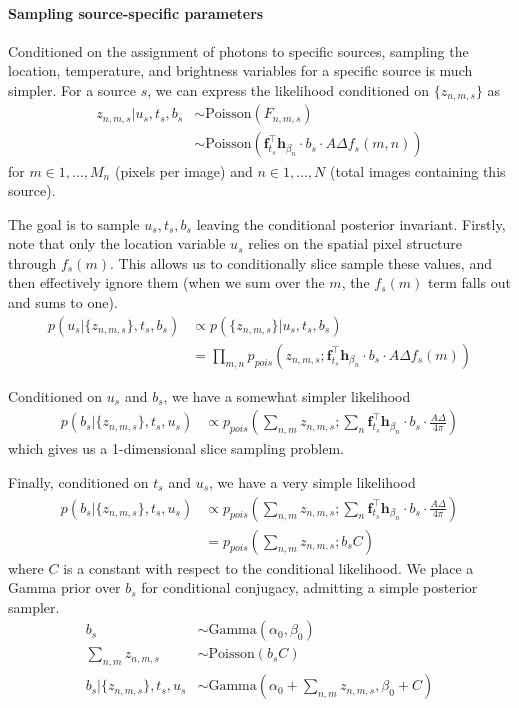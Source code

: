 \documentclass[11pt]{article}
\newcommand{\trans}{\intercal}
\begin{document}
\paragraph{Sampling source-specific parameters}
Conditioned on the assignment of photons to specific sources, sampling the location, temperature, and brightness variables for a specific source is much simpler.  For a source $s$, we can express the likelihood conditioned on $\{z_{n,m,s}\}$ as 
\begin{align}
  z_{n,m,s} | u_s, t_s, b_s 
    &\sim \textrm{Poisson}(F_{n,m,s}) \\
    &\sim \textrm{Poisson}\left(\mathbf{f}_{t_s}^\trans \mathbf{h}_{\beta_n} \cdot b_s \cdot A \Delta f_s(m,n) \right)
\end{align}
for $m \in 1, \dots, M_n$ (pixels per image) and $n \in 1, \dots, N$ (total images containing this source).  

The goal is to sample $u_s, t_s, b_s$ leaving the conditional posterior invariant.  Firstly, note that only the location variable $u_s$ relies on the spatial pixel structure through $f_s(m)$.  This allows us to conditionally slice sample these values, and then effectively ignore them (when we sum over the $m$, the $f_s(m)$ term falls out and sums to one).  
\begin{align}
  p(u_s | \{ z_{n,m,s} \}, t_s, b_s) &\propto p( \{ z_{n,m,s} \} | u_s, t_s, b_s) \\
  &= \prod_{m,n} p_{pois}\left(z_{n,m,s}; \mathbf{f}_{t_s}^\trans \mathbf{h}_{\beta_n} \cdot b_s \cdot A \Delta f_s(m) \right)
\end{align}

Conditioned on $u_s$ and $b_s$, we have a somewhat simpler likelihood 
\begin{align}
  p(b_s | \{z_{n,m,s}\}, t_s, u_s) 
    &\propto p_{pois}\left( \sum_{n,m} z_{n,m,s};  \sum_{n} \mathbf{f}_{t_s}^\trans \mathbf{h}_{\beta_n} \cdot b_s \cdot \frac{A \Delta}{4 \pi} \right) 
\end{align}
which gives us a 1-dimensional slice sampling problem.  

Finally, conditioned on $t_s$ and $u_s$, we have a very simple likelihood
\begin{align}
  p(b_s | \{z_{n,m,s}\}, t_s, u_s) 
    &\propto p_{pois}\left( \sum_{n,m} z_{n,m,s}; \sum_{n} \mathbf{f}_{t_s}^\trans \mathbf{h}_{\beta_n} \cdot b_s \cdot \frac{A \Delta}{4 \pi} \right) \\
    &= p_{pois}\left( \sum_{n,m} z_{n,m,s};  b_s C \right)
\end{align}
where $C$ is a constant with respect to the conditional likelihood.  We place a Gamma prior over $b_s$ for conditional conjugacy, admitting a simple posterior sampler. 
\begin{align}
  b_s &\sim \textrm{Gamma}(\alpha_0, \beta_0) \\
  \sum_{n,m} z_{n,m,s} &\sim \textrm{Poisson}(b_s C) \\
  b_s | \{z_{n,m,s}\}, t_s, u_s &\sim \textrm{Gamma}\left(\alpha_0 + \sum_{n,m}z_{n,m,s}, \beta_0 + C\right)
\end{align}
\end{document}
